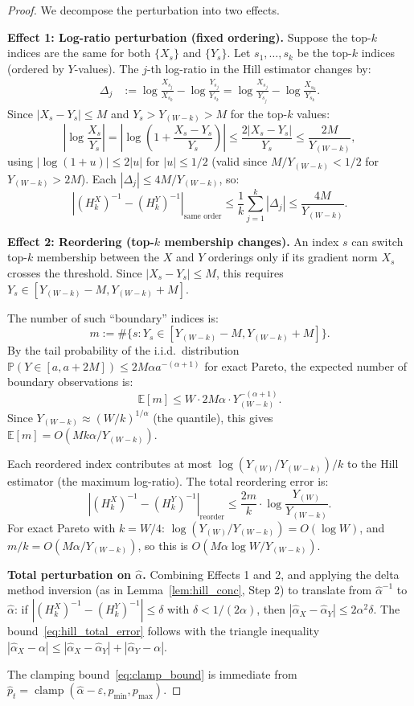 \documentclass[11pt]{article}
\theoremstyle{definition}
\newcommand{\E}{\mathbb{E}}
\newcommand{\Prob}{\mathbb{P}}
\newcommand{\abs}[1]{\left| #1 \right|}
\newcommand{\phat}{\hat{p}}
\newcommand{\ahat}{\hat{\alpha}}
\begin{document}
\begin{proof}
We decompose the perturbation into two effects.

\textbf{Effect 1: Log-ratio perturbation (fixed ordering).}
Suppose the top-$k$ indices are the same for both $\{X_s\}$ and $\{Y_s\}$.
Let $s_1, \ldots, s_k$ be the top-$k$ indices (ordered by $Y$-values).
The $j$-th log-ratio in the Hill estimator changes by:
\begin{align*}
  \Delta_j &:= \log\frac{X_{s_j}}{X_{s_k}} - \log\frac{Y_{s_j}}{Y_{s_k}}
  = \log\frac{X_{s_j}}{Y_{s_j}} - \log\frac{X_{s_k}}{Y_{s_k}}.
\end{align*}
Since $\abs{X_s - Y_s} \leq M$ and $Y_s > Y_{(W-k)} > M$ for the top-$k$
values:
\[
  \abs{\log\frac{X_s}{Y_s}} = \abs{\log\left(1 + \frac{X_s - Y_s}{Y_s}\right)}
  \leq \frac{2\abs{X_s - Y_s}}{Y_s}
  \leq \frac{2M}{Y_{(W-k)}},
\]
using $\abs{\log(1+u)} \leq 2\abs{u}$ for $\abs{u} \leq 1/2$
(valid since $M/Y_{(W-k)} < 1/2$ for $Y_{(W-k)} > 2M$).
Each $\abs{\Delta_j} \leq 4M/Y_{(W-k)}$, so:
\[
  \abs{(H_k^X)^{-1} - (H_k^Y)^{-1}}_{\text{same order}}
  \leq \frac{1}{k}\sum_{j=1}^k \abs{\Delta_j}
  \leq \frac{4M}{Y_{(W-k)}}.
\]

\textbf{Effect 2: Reordering (top-$k$ membership changes).}
An index $s$ can switch top-$k$ membership between the $X$ and $Y$ orderings
only if its gradient norm $X_s$ crosses the threshold. Since
$\abs{X_s - Y_s} \leq M$, this requires $Y_s \in [Y_{(W-k)} - M, Y_{(W-k)} + M]$.

The number of such ``boundary'' indices is:
\[
  m := \#\{s : Y_s \in [Y_{(W-k)} - M, Y_{(W-k)} + M]\}.
\]
By the tail probability of the i.i.d.\ distribution $\Prob(Y \in [a, a+2M])
\leq 2M\alpha a^{-(\alpha+1)}$ for exact Pareto, the expected number of
boundary observations is:
\[
  \E[m] \leq W \cdot 2M\alpha \cdot Y_{(W-k)}^{-(\alpha+1)}.
\]
Since $Y_{(W-k)} \approx (W/k)^{1/\alpha}$ (the quantile), this gives
$\E[m] = O(Mk\alpha / Y_{(W-k)})$.

Each reordered index contributes at most
$\log(Y_{(W)}/Y_{(W-k)})/k$ to the Hill estimator (the maximum
log-ratio). The total reordering error is:
\[
  \abs{(H_k^X)^{-1} - (H_k^Y)^{-1}}_{\text{reorder}}
  \leq \frac{2m}{k} \cdot \log\frac{Y_{(W)}}{Y_{(W-k)}}.
\]
For exact Pareto with $k = W/4$: $\log(Y_{(W)}/Y_{(W-k)}) = O(\log W)$,
and $m/k = O(M\alpha/Y_{(W-k)})$, so this is $O(M\alpha\log W / Y_{(W-k)})$.

\textbf{Total perturbation on $\ahat$.}
Combining Effects 1 and 2, and applying the delta method inversion
(as in Lemma~\ref{lem:hill_conc}, Step 2) to translate from $\ahat^{-1}$
to $\ahat$:
if $\abs{(H_k^X)^{-1} - (H_k^Y)^{-1}} \leq \delta$ with
$\delta < 1/(2\alpha)$, then $\abs{\ahat_X - \ahat_Y} \leq 2\alpha^2\delta$.
The bound~\eqref{eq:hill_total_error} follows with the triangle inequality
$\abs{\ahat_X - \alpha} \leq \abs{\ahat_X - \ahat_Y} + \abs{\ahat_Y - \alpha}$.

The clamping bound~\eqref{eq:clamp_bound} is immediate from
$\phat_t = \operatorname{clamp}(\ahat - \varepsilon, p_{\min}, p_{\max})$.
\end{proof}
\end{document}
